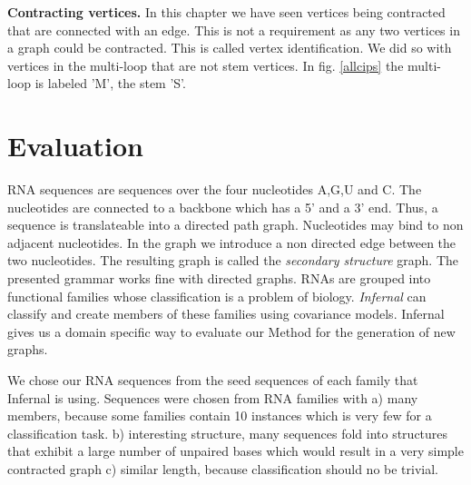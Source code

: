 \documentclass{article}
\begin{document}
\textbf{Contracting vertices.}
In this chapter we have seen vertices being contracted
that are connected with an edge. This is not a requirement
as any two vertices in a graph could be contracted. This
is called vertex identification.  
We did so with vertices in the multi-loop that are not stem vertices.
In fig. \ref{allcips} the multi-loop is labeled 'M', the stem 'S'.






\section{Evaluation}
RNA sequences are sequences over the four nucleotides A,G,U and C.
The nucleotides are connected to a backbone which 
has a 5' and a 3' end.
Thus, a sequence is translateable into a directed path graph.
Nucleotides may bind to non adjacent nucleotides.
In the graph we introduce a non directed edge between the two nucleotides.
The resulting graph is called the  \emph{secondary structure} graph.
The presented grammar works fine with directed graphs.
RNAs are grouped into functional families whose classification
is a problem of biology. \emph{Infernal}\cite{infernal} can classify and 
create members of these families using covariance models.
Infernal gives us a domain specific way to evaluate
our Method for the generation of new graphs. 

We chose our RNA sequences from the seed sequences of each family
that Infernal is using\cite{rfam}. Sequences were chosen from RNA families with
a) many members, because some families contain 10
instances which is very few for a classification task. b) interesting 
structure, many sequences fold into structures that exhibit a large number of 
unpaired bases which would result in a very simple contracted graph
c) similar length, because classification should no be trivial.
\end{document}
